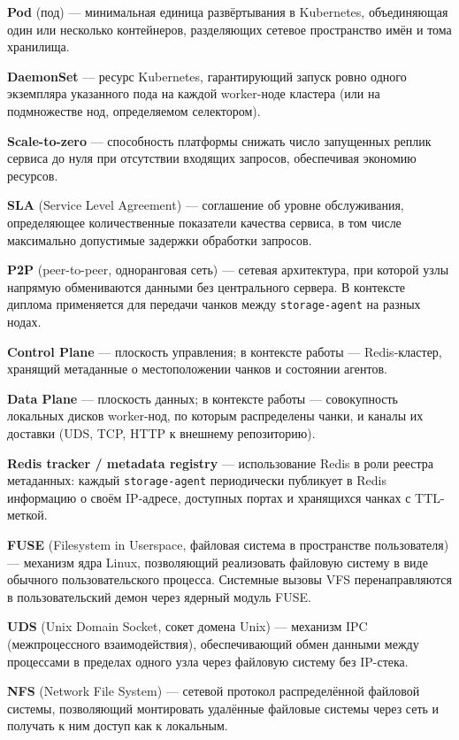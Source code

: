 \begin{sloppypar}
\textbf{Pod} (под) --- минимальная единица развёртывания в Kubernetes, объединяющая один или несколько контейнеров, разделяющих сетевое пространство имён и тома хранилища.

\textbf{DaemonSet} --- ресурс Kubernetes, гарантирующий запуск ровно одного экземпляра указанного пода на каждой worker-ноде кластера (или на подмножестве нод, определяемом селектором).

\textbf{Scale-to-zero} --- способность платформы снижать число запущенных реплик сервиса до нуля при отсутствии входящих запросов, обеспечивая экономию ресурсов.

\textbf{SLA} (Service Level Agreement) --- соглашение об уровне обслуживания, определяющее количественные показатели качества сервиса, в том числе максимально допустимые задержки обработки запросов.

\textbf{P2P} (peer-to-peer, одноранговая сеть) --- сетевая архитектура, при которой узлы напрямую обмениваются данными без центрального сервера. В контексте диплома применяется для передачи чанков между \texttt{storage-agent} на разных нодах.

\textbf{Control Plane} --- плоскость управления; в контексте работы --- Redis-кластер, хранящий метаданные о местоположении чанков и состоянии агентов.

\textbf{Data Plane} --- плоскость данных; в контексте работы --- совокупность локальных дисков worker-нод, по которым распределены чанки, и каналы их доставки (UDS, TCP, HTTP к внешнему репозиторию).

\textbf{Redis tracker / metadata registry} --- использование Redis в роли реестра метаданных: каждый \texttt{storage-agent} периодически публикует в Redis информацию о своём IP-адресе, доступных портах и хранящихся чанках с TTL-меткой.

\textbf{FUSE} (Filesystem in Userspace, файловая система в пространстве пользователя) --- механизм ядра Linux, позволяющий реализовать файловую систему в виде обычного пользовательского процесса. Системные вызовы VFS перенаправляются в пользовательский демон через ядерный модуль FUSE.

\textbf{UDS} (Unix Domain Socket, сокет домена Unix) --- механизм IPC (межпроцессного взаимодействия), обеспечивающий обмен данными между процессами в пределах одного узла через файловую систему без IP-стека.

\textbf{NFS} (Network File System) --- сетевой протокол распределённой файловой системы, позволяющий монтировать удалённые файловые системы через сеть и получать к ним доступ как к локальным.


\end{sloppypar}
